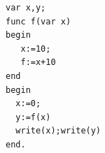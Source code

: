 \documentclass{article}
\begin{document}
\begin{verbatim}
var x,y;
func f(var x)
begin
   x:=10;
   f:=x+10
end
begin
  x:=0;
  y:=f(x)
  write(x);write(y)
end.
\end{verbatim}
\end{document}
